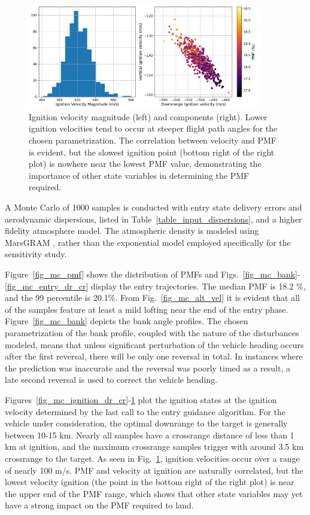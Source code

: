 \documentclass[letterpaper, paper,11pt]{AAS}
\begin{document}
\begin{figure}[h!]
	\centering
	\includegraphics[width=0.9\textwidth]{ignition_vz_vx} 
	\caption{Ignition velocity magnitude (left) and components (right). Lower ignition velocities tend to occur at steeper flight path angles for the chosen parametrization. The correlation between velocity and PMF is evident, but the slowest ignition point (bottom right of the right plot) is nowhere near the lowest PMF value, demonstrating the importance of other state variables in determining the PMF required.}
	\label{fig_mc_ignition_vel}
\end{figure}
A Monte Carlo of 1000 samples is conducted with entry state delivery errors and aerodynamic dispersions, listed in Table~\ref{table_input_dispersions}, and a higher fidelity atmosphere model. The atmospheric density is modeled using MarsGRAM \cite{MarsGRAM2010User}, rather than the exponential model employed specifically for the sensitivity study. 
 
Figure~\ref{fig_mc_pmf} shows the distribution of PMFs and
Figs.~\ref{fig_mc_bank}-\ref{fig_mc_entry_dr_cr} display the entry trajectories. The median PMF is 18.2 \%, and the 99 percentile is 20.1\%. From Fig.~\ref{fig_mc_alt_vel} it is evident that all of the samples feature at least a mild lofting near the end of the entry phase. 
Figure~\ref{fig_mc_bank} depicts the bank angle profiles. The chosen parametrization of the bank profile, coupled with the nature of the disturbances modeled, means that unless significant perturbation of the vehicle heading occurs after the first reversal, there will be only one reversal in total. In instances where the prediction was inaccurate and the reversal was poorly timed as a result, a late second reversal is used to correct the vehicle heading. 

Figures~\ref{fig_mc_ignition_dr_cr}-\ref{fig_mc_ignition_vel} plot the ignition states at the ignition velocity determined by the last call to the entry guidance algorithm. For the vehicle under consideration, the optimal downrange to the target is generally between 10-15 km. Nearly all samples have a crossrange distance of less than 1 km at ignition, and the maximum crossrange samples trigger with around 3.5 km crossrange to the target. As seen in Fig.~\ref{fig_mc_ignition_vel}, ignition velocities occur over a range of nearly 100 m/s. PMF and velocity at ignition are naturally correlated, but the lowest velocity ignition (the point in the bottom right of the right plot) is near the upper end of the PMF range, which shows that other state variables may yet have a strong impact on the PMF required to land.
\end{document}
